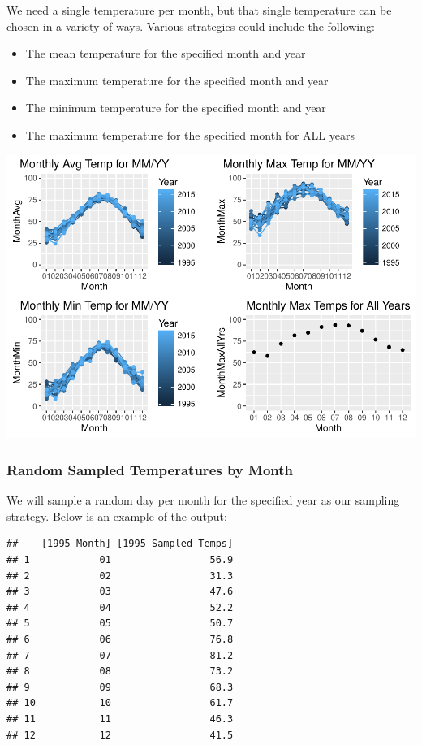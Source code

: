 \documentclass[]{article}
\providecommand{\tightlist}{%
  \setlength{\itemsep}{0pt}\setlength{\parskip}{0pt}}
\begin{document}
We need a single temperature per month, but that single temperature can
be chosen in a variety of ways. Various strategies could include the
following:

\begin{itemize}
\tightlist
\item
  The mean temperature for the specified month and year
\item
  The maximum temperature for the specified month and year
\item
  The minimum temperature for the specified month and year
\item
  The maximum temperature for the specified month for ALL years
\end{itemize}

\includegraphics{Paper-BuildingEnergySim_files/figure-latex/unnamed-chunk-10-1.pdf}

\subsubsection{Random Sampled Temperatures by
Month}\label{random-sampled-temperatures-by-month}

We will sample a random day per month for the specified year as our
sampling strategy. Below is an example of the output:

\begin{verbatim}
##    [1995 Month] [1995 Sampled Temps]
## 1            01                 56.9
## 2            02                 31.3
## 3            03                 47.6
## 4            04                 52.2
## 5            05                 50.7
## 6            06                 76.8
## 7            07                 81.2
## 8            08                 73.2
## 9            09                 68.3
## 10           10                 61.7
## 11           11                 46.3
## 12           12                 41.5
\end{verbatim}
\end{document}
